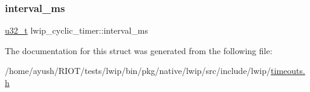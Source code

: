 \mbox{\label{structlwip__cyclic__timer_addbc7ac275287e62a81cdd16b3dd56f9}} 
\subsubsection{\texorpdfstring{interval\+\_\+ms}{interval\_ms}}
{\footnotesize\ttfamily \hyperlink{group__compiler__abstraction_ga4c14294869aceba3ef9d4c0c302d0f33}{u32\+\_\+t} lwip\+\_\+cyclic\+\_\+timer\+::interval\+\_\+ms}



The documentation for this struct was generated from the following file\+:\begin{DoxyCompactItemize}
\item 
/home/ayush/\+R\+I\+O\+T/tests/lwip/bin/pkg/native/lwip/src/include/lwip/\hyperlink{native_2lwip_2src_2include_2lwip_2timeouts_8h}{timeouts.\+h}\end{DoxyCompactItemize}
